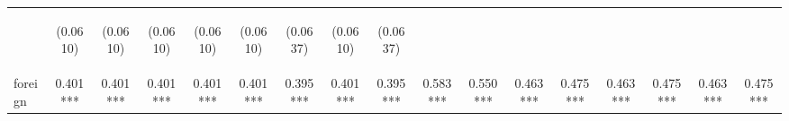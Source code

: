 \begin{center}
\begin{tabular}{lcccccccccccccccc}
\vspace{4pt} & \begin{footnotesize}(0.0610)\end{footnotesize} & \begin{footnotesize}(0.0610)\end{footnotesize} & \begin{footnotesize}(0.0610)\end{footnotesize} & \begin{footnotesize}(0.0610)\end{footnotesize} & \begin{footnotesize}(0.0610)\end{footnotesize} & \begin{footnotesize}(0.0637)\end{footnotesize} & \begin{footnotesize}(0.0610)\end{footnotesize} & \begin{footnotesize}(0.0637)\end{footnotesize} & \begin{footnotesize}\end{footnotesize} & \begin{footnotesize}\end{footnotesize} & \begin{footnotesize}\end{footnotesize} & \begin{footnotesize}\end{footnotesize} & \begin{footnotesize}\end{footnotesize} & \begin{footnotesize}\end{footnotesize} & \begin{footnotesize}\end{footnotesize} & \begin{footnotesize}\end{footnotesize} \\
foreign & 0.401*** & 0.401*** & 0.401*** & 0.401*** & 0.401*** & 0.395*** & 0.401*** & 0.395*** & 0.583*** & 0.550*** & 0.463*** & 0.475*** & 0.463*** & 0.475*** & 0.463*** & 0.475*** \\

\end{tabular}
\end{center}
